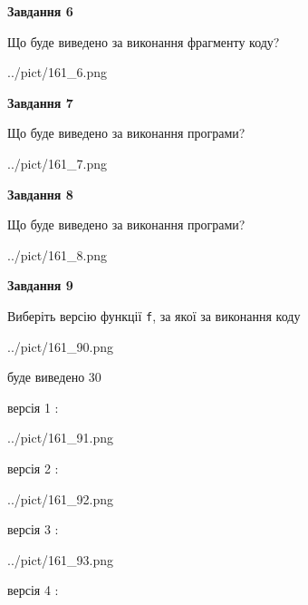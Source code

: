 \documentclass[12pt, ukrainian]{article}
\def\code#1{\Verb!#1!}
\begin{document}
{\begin {large}
{\begin {center}\textbf{Завдання 6}\end {center}}

Що буде виведено за виконання фрагменту коду?\par
\begin{center}
	{../pict/161_6.png}
\end{center}
\newpage

{\begin {center}\textbf{Завдання 7}\end {center}}

Що буде виведено за виконання програми?\par
\begin{center}
	{../pict/161_7.png}
\end{center}
\newpage

{\begin {center}\textbf{Завдання 8}\end {center}}

Що буде виведено за виконання програми?\par
\begin{center}
	{../pict/161_8.png}
\end{center}
\newpage

{\begin {center}\textbf{Завдання 9}\end {center}}

Виберіть версію функції \code{f}, за якої за виконання коду
\begin{center}
	{../pict/161_90.png}
\end{center}
буде виведено 30

\vspace{5mm}
версія 1 :

\begin{center}
	{../pict/161_91.png}
\end{center}
версія 2 :

\begin{center}
	{../pict/161_92.png}
\end{center}
версія 3 :

\begin{center}
	{../pict/161_93.png}
\end{center}
версія 4 :


\end{large}}
\end{document}
